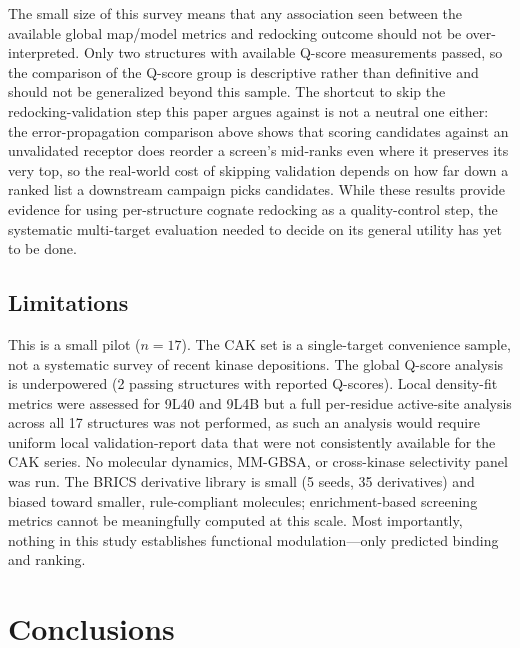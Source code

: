 \documentclass[global,twocolumn]{svjour}
\begin{document}
The small size of this survey means that any association seen between the
available global map/model metrics and redocking outcome should not be
over-interpreted. Only two structures with available Q-score measurements
passed, so the comparison of the Q-score group is descriptive rather than
definitive and should not be generalized beyond this sample. The shortcut
to skip the redocking-validation step this paper argues against is not a
neutral one either: the error-propagation comparison above shows that
scoring candidates against an unvalidated receptor does reorder a screen's
mid-ranks even where it preserves its very top, so the real-world cost of
skipping validation depends on how far down a ranked list a downstream
campaign picks candidates. While these results provide evidence for using
per-structure cognate redocking as a quality-control step, the systematic
multi-target evaluation needed to decide on its general utility has yet to
be done.

\subsection{Limitations}

This is a small pilot ($n=17$). The CAK set is a single-target convenience
sample, not a systematic survey of recent kinase depositions. The global
Q-score analysis is underpowered (2 passing structures with reported
Q-scores). Local density-fit metrics were assessed for 9L40 and 9L4B but a
full per-residue active-site analysis across all 17 structures was not
performed, as such an analysis would require uniform local validation-report
data that were not consistently available for the CAK series. No molecular
dynamics, MM-GBSA, or cross-kinase selectivity panel was run. The BRICS
derivative library is small (5 seeds, 35 derivatives) and biased toward
smaller, rule-compliant molecules; enrichment-based screening metrics cannot
be meaningfully computed at this scale. Most importantly, nothing in this
study establishes functional modulation---only predicted binding and ranking.

\section{Conclusions}
\end{document}
